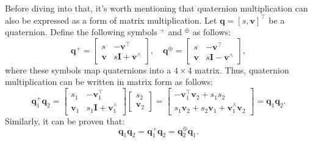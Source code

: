 Before diving into that, it's worth mentioning that quaternion multiplication can also be expressed as a form of matrix multiplication. Let $\mathbf{q}=[s,\mathbf{v}]^\top$ be a quaternion. Define the following symbols $^{+}$ and $^{\oplus}$ as follows\cite{Barfoot2011}:
\begin{equation}
	\mathbf{q}^{+}=\left[\begin{array}{cc}
		s&-\mathbf{v}^\top \\
		\mathbf{v}&s\mathbf{I}+\mathbf{v}^{\wedge}
	\end{array}\right],\quad 
	\mathbf{q}^{\oplus}=
	\left[\begin{array}{cc}
		s & -\mathbf{v}^\top \\
		\mathbf{v} & s\mathbf{I}-\mathbf{v}^{\wedge}
	\end{array}\right],
\end{equation}
where these symbols map quaternions into a $4\times 4$ matrix. Thus, quaternion multiplication can be written in matrix form as follows:
\begin{equation}
	\mathbf{q}_1^ + {\mathbf{q}_2} = \left[ {\begin{array}{*{20}{c}}
			s_1&-\mathbf{v}_1^\top\\
			\mathbf{v}_1 & s_1 \mathbf{I} + \mathbf{v}_1^\wedge
	\end{array}} \right]\left[ {\begin{array}{*{20}{c}}
			{{s _2}} \\
			{{\mathbf{v} _2}}
	\end{array}} \right] = \left[ {\begin{array}{*{20}{c}}
			{ - \mathbf{v} _1^\top{\mathbf{v} _2} + {s _1}{s _2}} \\ 
			{{s _1}{\mathbf{v} _2} + {s _2}{\mathbf{v} _1} + \mathbf{v} _1^ \wedge {\mathbf{v} _2}}
	\end{array}} \right] = \mathbf{q}_1 \mathbf{q}_2.
\end{equation}
Similarly, it can be proven that:
\begin{equation}
	\mathbf{q}_1 \mathbf{q}_2 = \mathbf{q}_1^{+} \mathbf{q}_2 = \mathbf{q}_2^{\oplus} \mathbf{q}_1.
\end{equation}

